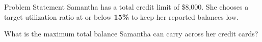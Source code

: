 \begin{block}{Problem Statement}
  Samantha has a total credit limit of \$8,000. She chooses a target utilization ratio at or below \textbf{15\%} to keep her reported balances low.

  What is the maximum total balance Samantha can carry across her credit cards?
\end{block}

\vspace{0.8em}
\centering
{}
